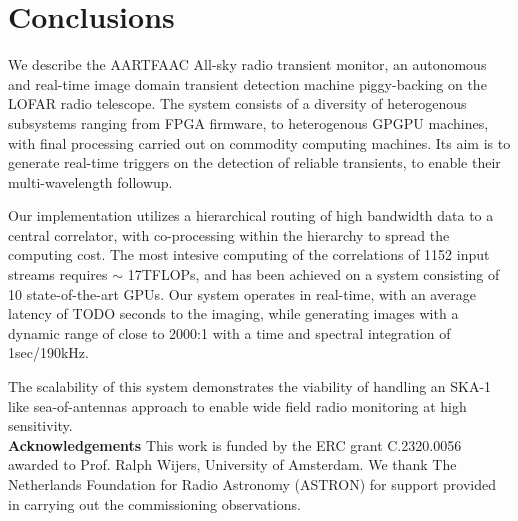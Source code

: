 \documentclass{ws-jai}
\begin{document}

\section {\label{sec:conclusion} Conclusions}
We  describe the  AARTFAAC All-sky  radio transient  monitor, an  autonomous and
real-time image  domain transient detection  machine piggy-backing on  the LOFAR
radio telescope. The  system consists of a diversity  of heterogenous subsystems
ranging  from  FPGA  firmware,  to   heterogenous  GPGPU  machines,  with  final
processing carried out on commodity computing  machines.  Its aim is to generate
real-time  triggers on  the detection  of reliable  transients, to  enable their
multi-wavelength followup.

Our implementation utilizes  a hierarchical routing of high bandwidth  data to a
central  correlator,  with co-processing  within  the  hierarchy to  spread  the
computing cost.  The most intesive computing  of the correlations of  1152 input
streams requires $\sim$ 17TFLOPs, and has  been achieved on a system consisting of
10  state-of-the-art GPUs.  Our system  operates in  real-time, with  an average
latency of TODO  seconds to the imaging, while generating  images with a dynamic
range of close to 2000:1 with a time and spectral integration of 1sec/190kHz.

The scalability of  this system demonstrates the viability of  handling an SKA-1
like  sea-of-antennas approach  to enable  wide field  radio monitoring  at high
sensitivity.\\

\noindent \textbf{Acknowledgements}
This work is funded by the ERC grant C.2320.0056 awarded to Prof.  Ralph Wijers,
University  of Amsterdam. We  thank The  Netherlands  Foundation for  Radio
Astronomy  (ASTRON)  for support  provided  in  carrying out  the  commissioning
observations.



\end{document}
